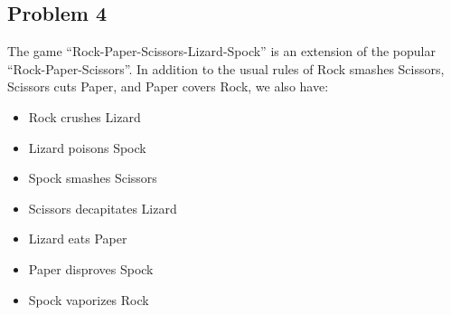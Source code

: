 \documentclass{math}
\begin{document}
\subsection*{Problem 4}
The game ``Rock-Paper-Scissors-Lizard-Spock'' is an extension of the popular
``Rock-Paper-Scissors''. In addition to the usual rules of Rock smashes
Scissors, Scissors cuts Paper, and Paper covers Rock, we also have:
\begin{itemize}
  \item Rock crushes Lizard
  \item Lizard poisons Spock
  \item Spock smashes Scissors
  \item Scissors decapitates Lizard
  \item Lizard eats Paper
  \item Paper disproves Spock
  \item Spock vaporizes Rock
\end{itemize}
\end{document}
